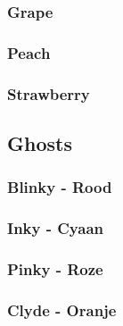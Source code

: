 \documentclass{report}
\begin{document}

      \subsubsection{Grape} %
      \label{ssub:grape}


      \subsubsection{Peach} %
      \label{ssub:peach}


      \subsubsection{Strawberry} %
      \label{ssub:strawberry}


    \subsection{Ghosts} %
    \label{sub:ghosts}

      \subsubsection{Blinky - Rood} %
      \label{ssub:blinky}


      \subsubsection{Inky - Cyaan} %
      \label{ssub:inky}


      \subsubsection{Pinky - Roze} %
      \label{ssub:pinky}


      \subsubsection{Clyde - Oranje} %
      \label{ssub:clyde}
\end{document}
